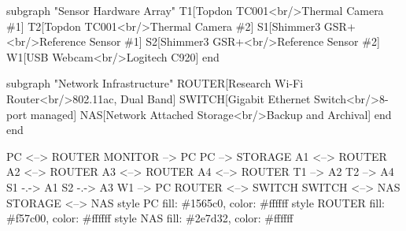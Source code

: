 \documentclass[11pt,a4paper]{report}
\begin{document}
        subgraph "Sensor Hardware Array"
            T1[Topdon TC001<br/>Thermal Camera \#1]
            T2[Topdon TC001<br/>Thermal Camera \#2]
            S1[Shimmer3 GSR+<br/>Reference Sensor \#1]
            S2[Shimmer3 GSR+<br/>Reference Sensor \#2]
            W1[USB Webcam<br/>Logitech C920]
        end

        subgraph "Network Infrastructure"
            ROUTER[Research Wi-Fi Router<br/>802.11ac, Dual Band]
            SWITCH[Gigabit Ethernet Switch<br/>8-port managed]
            NAS[Network Attached Storage<br/>Backup and Archival]
        end
    end

    PC <--> ROUTER
    MONITOR --> PC
    PC --> STORAGE
    A1 <--> ROUTER
    A2 <--> ROUTER
    A3 <--> ROUTER
    A4 <--> ROUTER
    T1 --> A2
    T2 --> A4
    S1 -.-> A1
    S2 -.-> A3
    W1 --> PC
    ROUTER <--> SWITCH
    SWITCH <--> NAS
    STORAGE <--> NAS
    style PC fill: \#1565c0, color: \#ffffff
    style ROUTER fill: \#f57c00, color: \#ffffff
    style NAS fill: \#2e7d32, color: \#ffffff
\end{document}
